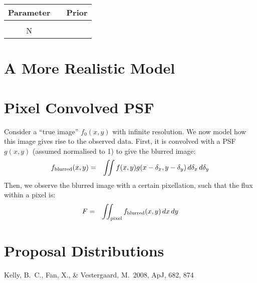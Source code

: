 \documentclass[letterpaper, 11pt]{article}
\begin{document}
\begin{table}
\begin{tabular}{ccc}
Parameter & \vline & Prior \\
\hline \\
N & & \\
\end{tabular}
\end{table}

\section{A More Realistic Model}
\citep{2008ApJ...682..874K}

\appendix
\section{Pixel Convolved PSF}
Consider a ``true image'' $f_0(x, y)$ with infinite resolution. We now model how this image
gives rise to the observed data. First, it is convolved with a
PSF $g(x,y)$ (assumed normalised to 1) to give the blurred image:
\begin{eqnarray}
f_{\rm{blurred}}(x,y) &=& \iint f(x, y)g(x - \delta_x, y - \delta_y) \, d\delta_x \, d\delta_y
\end{eqnarray}
Then, we observe the blurred image with a certain pixellation, such that
the flux within a pixel is:
\begin{eqnarray}
F &=& \iint_{\rm{pixel}} f_{\rm blurred}(x, y) \,dx\,dy
\end{eqnarray}



\section{Proposal Distributions}



\begin{thebibliography}{99}
 Kelly, B.~C., Fan, X., 
\& Vestergaard, M.\ 2008, ApJ, 682, 874 
\end{thebibliography}
\end{document}

